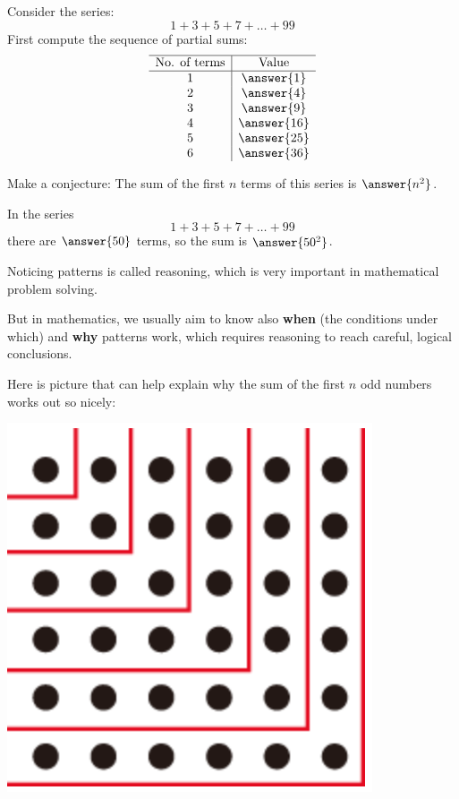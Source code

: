 \documentclass[nooutcomes]{ximera}
\begin{document}
\begin{problem}
Consider the series: 
\[
1+3+5+7+\dots+99
\]
First compute the sequence of partial sums: 
\[
\begin{array}{c|c} \hline
\text{No. of terms} & \text{Value} \\ \hline
1 & \answer{1} \\
2 & \answer{4} \\
3 & \answer{9}\\
4 & \answer{16}\\
5 & \answer{25}\\
6 & \answer{36}\\
\end{array}
\]
\begin{problem}
Make a conjecture: The sum of the first $n$ terms of this series is $\answer{n^2}$. 

In the series
\[
1+3+5+7+\dots+99
\]
there are $\answer{50}$ terms, so the sum is $\answer{50^2}$.  

\begin{problem}
Noticing patterns is called 
reasoning, which is very important in mathematical problem solving. 

But in mathematics, we usually aim to know also \textbf{when} (the conditions under which) and \textbf{why} patterns work, which requires  
 reasoning to reach careful, logical conclusions.  

Here is picture that can help explain why the sum of the first $n$ odd numbers works out so nicely: 
\begin{image}
\includegraphics[scale=0.5]{sumOdds.png}
\end{image}


\end{problem}
\end{problem}
\end{problem}
\end{document}
